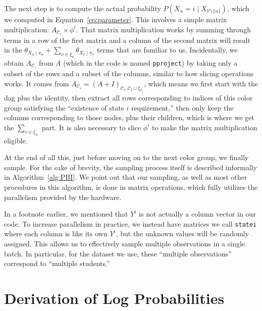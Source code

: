\documentclass{article} %
\begin{document}
The next step is to compute the actual probability $P(X_u = i \mid X_{\mathcal{V}\setminus \{u\}})$,
which we computed in Equation~\ref{eq:parameter}. This involves a simple matrix multiplication:
$A_{\mathcal{C}_i} \times \phi^i$. That matrix multiplication works by summing through terms in a
row of the first matrix and a column of the second matrix will result in the $\theta_{X_u\mid \pi_u}
+ \sum_{v\in\xi_{u}} \theta_{X_v\mid \pi_v}$ terms that are familiar to us. Incidentally, we obtain
$A_{\mathcal{C}_i}$ from $A$ (which in the code is named \texttt{pproject}) by taking only a subset
of the rows and a subset of the columns, similar to how slicing operations works. It comes from
$A_{\mathcal{C}_i} = (A + I)_{\mathcal{C}_i, \mathcal{C}_i \cup \xi_{\mathcal{C}_i}}$, which means
we first start with the dag plus the identity, then extract all rows corresponding to indices of
this color group satisfying the ``existence of state $i$ requirement,'' then only keep the columns
corresponding to those nodes, plus their children, which is where we get the $\sum_{v\in \xi_{u}}$
part. It is also necessary to slice $\phi^i$ to make the matrix multiplication eligible.

At the end of all this, just before moving on to the next color group, we finally sample. For the
sake of brevity, the sampling process itself is described informally in Algorithm~\ref{alg:PBI}. We
point out that our sampling, as well as most other procedures in this algorithm, is done in matrix
operations, which fully utilizes the parallelism provided by the hardware.

In a footnote earlier, we mentioned that $Y^i$ is not actually a column vector in our code. To
increase parallelism in practice, we instead have matrices we call \texttt{statei} where each column
is like its own $Y^i$, but the unknown values will be randomly assigned. This allows us to
effectively sample multiple observations in a single batch. In particular, for the dataset we use,
these ``multiple observations'' correspond to ``multiple students.''

\section{Derivation of Log Probabilities}\label{app:math}
\end{document}
